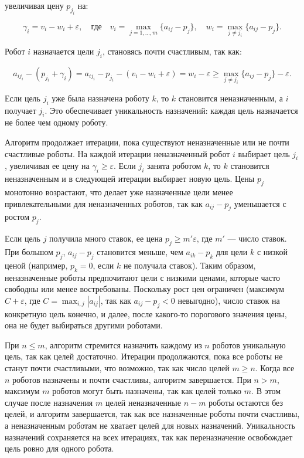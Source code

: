 \noindent увеличивая цену \( p_{j_i} \) на:

\[
\gamma_i = v_i - w_i + \varepsilon, \quad \text{где} \quad v_i = \max_{j=1,\ldots,m} \{a_{ij} - p_j\}, \quad w_i = \max_{j \neq j_i} \{a_{ij} - p_j\}.
\]

\noindent Робот \( i \) назначается цели \( j_i \), становясь почти счастливым, так как:

\[
a_{i j_i} - (p_{j_i} + \gamma_i) = a_{i j_i} - p_{j_i} - (v_i - w_i + \varepsilon) = w_i - \varepsilon \geq \max_{j \neq j_i} \{a_{ij} - p_j\} - \varepsilon.
\]

Если цель \( j_i \) уже была назначена роботу \( k \), то \( k \) становится неназначенным, а \( i \) получает \( j_i \). Это обеспечивает уникальность назначений: каждая цель назначается не более чем одному роботу.

Алгоритм продолжает итерации, пока существуют неназначенные или не почти счастливые роботы. На каждой итерации неназначенный робот \( i \) выбирает цель \( j_i \), увеличивая ее цену на \( \gamma_i \geq \varepsilon \). Если \( j_i \) занята роботом \( k \), то \( k \) становится неназначенным и в следующей итерации выбирает новую цель. Цены \( p_j \) монотонно возрастают, что делает уже назначенные цели менее привлекательными для неназначенных роботов, так как \( a_{ij} - p_j \) уменьшается с ростом \( p_j \).

Если цель \( j \) получила много ставок, ее цена \( p_j \geq m' \varepsilon \), где \( m' \) — число ставок. При большом \( p_j \), \( a_{ij} - p_j \) становится меньше, чем \( a_{ik} - p_k \) для цели \( k \) с низкой ценой (например, \( p_k = 0 \), если \( k \) не получала ставок). Таким образом, неназначенные роботы предпочитают цели с низкими ценами, которые часто свободны или менее востребованы. Поскольку рост цен ограничен (максимум \( C + \varepsilon \), где \( C = \max_{i,j} |a_{ij}| \), так как \( a_{ij} - p_j < 0 \) невыгодно), число ставок на конкретную цель конечно, и далее, после какого-то порогового значения цены, она не будет выбираться другими роботами.

При \( n \leq m \), алгоритм стремится назначить каждому из \( n \) роботов уникальную цель, так как целей достаточно. Итерации продолжаются, пока все роботы не станут почти счастливыми, что возможно, так как число целей \( m \geq n \). Когда все \( n \) роботов назначены и почти счастливы, алгоритм завершается. При \( n > m \), максимум \( m \) роботов могут быть назначены, так как целей только \( m \). В этом случае после назначения \( m \) целей неназначенные \( n - m \) роботы остаются без целей, и алгоритм завершается, так как все назначенные роботы почти счастливы, а неназначенным роботам не хватает целей для новых назначений. Уникальность назначений сохраняется на всех итерациях, так как переназначение освобождает цель ровно для одного робота.

